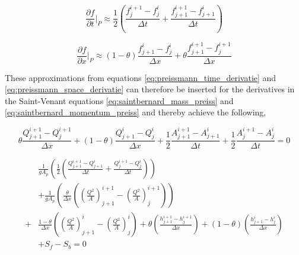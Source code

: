 \begin{equation}\label{eq:preissmann_time_derivatie}
    \frac{\partial f}{\partial t}\bigg \rvert_P \approx \frac{1}{2}\left(\frac{f_j^{i+1}-f_j^i}{\Delta t}+\frac{f_{j+1}^{i+1}-f_{j+1}^i}{\Delta t}\right)
\end{equation}

\begin{equation}\label{eq:preissmann_space_derivatie}
    \frac{\partial f}{\partial x}\bigg \rvert_P \approx (1-\theta)\frac{f_{j+1}^i-f_{j}^i}{\Delta x}+\theta \frac{f_{j+1}^{i+1}-f_{j}^{i+1}}{\Delta x}
\end{equation}

These approximations from equations \ref{eq:preissmann_time_derivatie} and \ref{eq:preissmann_space_derivatie} can therefore be inserted for the derivatives in the Saint-Venant equations \ref{eq:saintbernard_mass_preiss} and \ref{eq:saintbernard_momentum_preiss} and thereby achieve the following,

\begin{equation}\label{eq:continuity_eq_preissmann}
    \theta \frac{Q_{j+1}^{i+1}-Q_j^{i+1}}{\Delta x}+(1-\theta)\frac{Q_{j+1}^i - Q_j^i}{\Delta x}+
    \frac{1}{2}\frac{A_{j+1}^{i+1}-A_{j+1}^i}{\Delta t} + \frac{1}{2} \frac{A_{j}^{i+1} - A_j^i}{\Delta t} = 0
\end{equation}

\begin{equation}\label{eq:Momentum_eq_preissmann_discrete}
\begin{aligned}
    &\frac{1}{gA_p}\left(\frac{1}{2} \left(\frac{Q_{j+1}^{i+1}-Q_{j+1}^i}{\Delta t}+\frac{Q_{j}^{i+1} - Q_j^i}{\Delta t}\right)\right)\\ &+ \frac{1}{gA_p}\left(\frac{\theta}{\Delta x} \left(\left(\frac{Q^2}{A}\right)_{j+1}^{i+1}-\left(\frac{Q^2}{A}\right)_{j}^{i+1}\right)\right) \\+  &\frac{1-\theta}{\Delta x}\left(\left(\frac{Q^2}{A}\right)_{j+1}^{i}-\left(\frac{Q^2}{A}\right)_{j}^{i}\right)+\theta \left(\frac{h_{j+1}^{i+1}-h_j^{i+1}}{\Delta x}\right)+ (1-\theta)\left(\frac{h_{j+1}^{i} - h_j^i}{\Delta x}\right)\\&+S_f-S_b= 0
    \end{aligned}
\end{equation}

